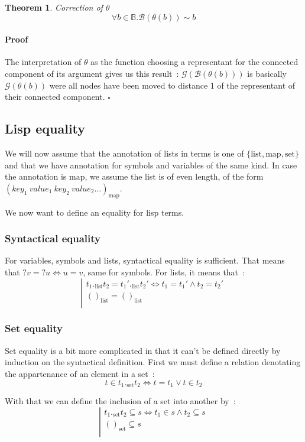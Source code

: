 \documentclass[]{article}
\newcommand{\B}{\mathscr{B}}
\newcommand{\G}{\mathscr{G}}
\newcommand{\1}{\mathbbm{1}}
\newcommand{\0}{\mathbbm{0}}
\newtheorem{theo}{Theorem}
\newenvironment{prf}{\paragraph{Proof}}{\hfill$\square$}
\renewcommand{\subset}{\subseteq}
\begin{document}
\begin{theo}{Correction of $\theta$}
    \[ \forall b\in\mathbb{B}. \B(\theta(b)) \sim b \]
\end{theo}
\begin{prf}
    The interpretation of $\theta$ as the function choosing a representant for the
    connected component of its argument gives us this result~: $\G(\B(\theta(b)))$ is
    basically $\G(\theta(b))$ were all nodes have been moved to distance 1 of the
    representant of their connected component.
\end{prf}

\subsection{Lisp equality}

We will now assume that the annotation of lists in terms is one of $\{\text{list},
\text{map}, \text{set}\}$ and that we have annotation for symbols and variables
of the same kind. In case the annotation is $\text{map}$, we assume the list is of
even length, of the form $(key_1\ value_1\ key_2\ value_2\dots)_\text{map}$.

We now want to define an equality for lisp terms.

\subsubsection{Syntactical equality}

For variables, symbols and lists, syntactical equality is sufficient. That means
that $?v = ?u \iff u = v$, same for symbols. For lists, it means that~:
\[\left|\begin{array}{l}
    t_1._\text{list}t_2 = t_1'._\text{list}t_2'\iff t_1 = t_1' \wedge t_2 = t_2'\\
    ()_\text{list} = ()_\text{list} \\
\end{array}\right.\]

\subsubsection{Set equality}

Set equality is a bit more complicated in that it can't be defined directly by
induction on the syntactical definition. First we must define a relation denotating the
appartenance of an element in a set~:
\[t\in t_1._\text{set}t_2\iff t = t_1\vee t\in t_2\]

With that we can define the inclusion of a set into another by~:
\[\left|\begin{array}{l}
    t_1._\text{set}t_2\subset s\iff t_1\in s\wedge t_2\subset s \\
    ()_\text{set}\subseteq s \\
\end{array}\right.\]
\end{document}
